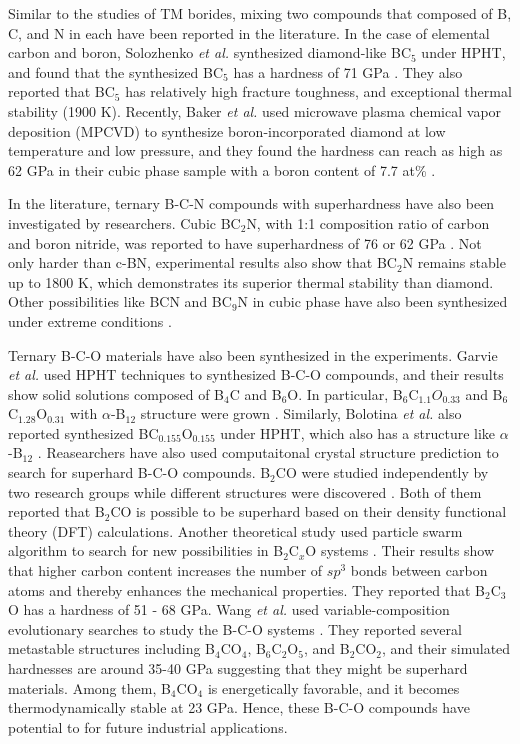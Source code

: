 Similar to the studies of TM borides, mixing two compounds that composed of B, C, and N in each have been reported in the literature. In the case of elemental carbon and boron, Solozhenko {\it et al.} synthesized diamond-like BC$_5$ under HPHT, and found that the synthesized BC$_5$ has a hardness of 71 GPa \cite{PhysRevLett.102.015506}. They also reported that BC$_5$ has relatively high fracture toughness, and exceptional thermal stability (1900 K). Recently, Baker {\it et al.} used microwave plasma chemical vapor deposition (MPCVD) to synthesize boron-incorporated diamond at low temperature and low pressure, and they found the hardness can reach as high as 62 GPa in their cubic phase sample with a boron content of 7.7 at\% \cite{baker2018computational}. 

In the literature, ternary B-C-N compounds with superhardness have also been investigated by researchers. Cubic BC$_2$N, with 1:1 composition ratio of carbon and boron nitride, was reported to have superhardness of 76 or 62 GPa \cite{solozhenko2001mechanical, BC2N_solozhenko2001synthesis, BC2N_zhao2002superhard}. Not only harder than c-BN, experimental results also show that BC$_2$N remains stable up to 1800 K, which demonstrates its superior thermal stability than diamond. Other possibilities like BCN and BC$_9$N in cubic phase have also been synthesized under extreme conditions \cite{BCN_liu2011synthesis}.

Ternary B-C-O materials have also been synthesized in the experiments. Garvie {\it et al.} used HPHT techniques to synthesized B-C-O compounds, and their results show solid solutions composed of B$_4$C and B$_6$O. In particular,
B$_6$C$_{1.1}O_{0.33}$ and B$_6$C$_{1.28}$O$_{0.31}$ with $\alpha$-B$_{12}$ structure were grown \cite{hubert1997high}. Similarly, Bolotina {\it et al.} also reported synthesized BC$_{0.155}$O$_{0.155}$ under HPHT, which also has a structure like $\alpha$-B$_{12}$ \cite{bolotina2001atomic}. Reasearchers have also used computaitonal crystal structure prediction to search for superhard B-C-O compounds. B$_2$CO were studied independently by two research groups while different structures were discovered \cite{li2011b2co,liu2017superhard}. Both of them reported that B$_2$CO is possible to be superhard based on their density functional theory (DFT) calculations. Another theoretical study used particle swarm algorithm to search for new possibilities in B$_2$C$_x$O systems \cite{zhang2015influences}. Their results show that higher carbon content increases the number of $sp^3$ bonds between carbon atoms and thereby enhances the mechanical properties. They reported that B$_2$C$_3$O has a hardness of 51 - 68 GPa. Wang {\it et al.} used variable-composition evolutionary searches to study the B-C-O systems \cite{wang2016novel}. They reported several metastable structures including B$_4$CO$_4$, B$_6$C$_2$O$_5$, and B$_2$CO$_2$, and their simulated hardnesses are around 35-40 GPa suggesting that they might be superhard materials. Among them, B$_4$CO$_4$ is energetically favorable, and it becomes thermodynamically stable at 23 GPa. Hence, these B-C-O compounds have potential to for future industrial applications.

